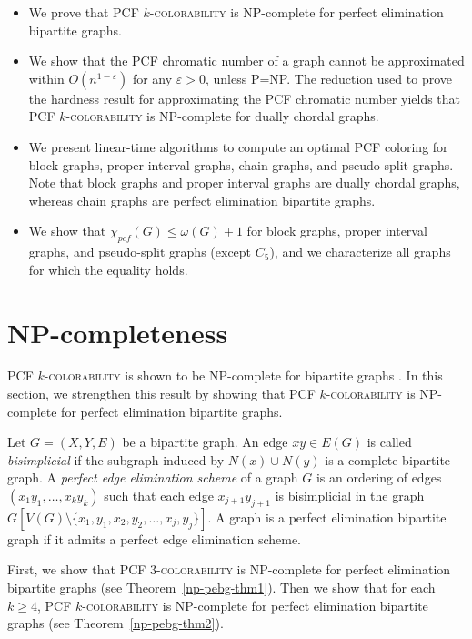 \documentclass[11pt]{article}
\theoremstyle{plain}
\begin{document}
	\begin{itemize}
		\item We prove that \textsc{PCF $k$-colorability} is NP-complete for perfect elimination bipartite graphs.
		\item We show that the PCF chromatic number of a graph cannot be approximated within $O(n^{1-\varepsilon})$ for any $\varepsilon>0$, unless P=NP. The reduction used to prove the hardness result for approximating the PCF chromatic number yields that PCF $k$-\textsc{colorability} is NP-complete for dually chordal graphs.
		\item We present linear-time algorithms to compute an optimal PCF coloring for block graphs, proper interval graphs, chain graphs, and pseudo-split graphs. Note that block graphs and proper interval graphs are dually chordal graphs, whereas chain graphs are perfect elimination bipartite graphs.
		
		\item We show that $\chi_{pcf}(G)\leq \omega(G)+1$ for block graphs, proper interval graphs, and pseudo-split graphs (except $C_5$), and we characterize all graphs for which the equality holds.
	\end{itemize}
	
	\section{NP-completeness}
	
	PCF $k$-\textsc{colorability} is shown to be NP-complete for bipartite graphs \cite{AIO}. In this section, we strengthen this result by showing that PCF $k$-\textsc{colorability} is NP-complete for perfect elimination bipartite graphs.
	
	\medskip
	
	Let $G=(X,Y,E)$ be a bipartite graph. An edge $xy\in E(G)$ is called \emph{bisimplicial} if the subgraph induced by $N(x)\cup N(y)$ is a complete bipartite graph. A \emph{perfect edge elimination scheme} of a graph $G$ is an ordering of edges $(x_1y_1,\ldots,x_ky_k)$ such that each edge $x_{j+1}y_{j+1}$ is bisimplicial in the graph $G[V(G)\setminus\{x_1, y_1, x_2, y_2, \ldots, x_{j}, y_{j}\}]$.
	A graph is a perfect elimination bipartite graph if it admits a perfect edge elimination scheme.
	
	\medskip
	
	
	First, we show that PCF $3$-\textsc{colorability} is NP-complete for perfect elimination bipartite graphs (see Theorem~\ref{np-pebg-thm1}). Then we show that for each $k\geq 4$, PCF $k$-\textsc{colorability} is NP-complete for perfect elimination bipartite graphs (see Theorem~\ref{np-pebg-thm2}). 
	
\end{document}
